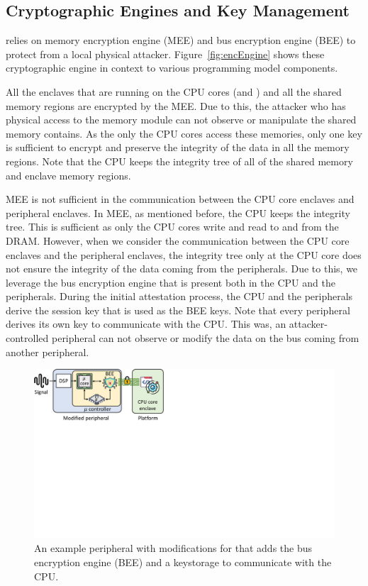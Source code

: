 \subsection{Cryptographic Engines and Key Management}

  \name relies on memory encryption engine (MEE) and bus encryption engine (BEE) to protect from a local physical attacker. Figure~\ref{fig:encEngine} shows these cryptographic engine in context to various \name programming model components.

  All the enclaves that are running on the CPU cores (\app and \ce) and all the shared memory regions are encrypted by the MEE. Due to this, the attacker who has physical access to the memory module can not observe or manipulate the shared memory contains. As the only the CPU cores access these memories, only one key is sufficient to encrypt and preserve the integrity of the data in all the memory regions. Note that the CPU keeps the integrity tree of all of the shared memory and enclave memory regions.

  MEE is not sufficient in the communication between the CPU core enclaves and peripheral enclaves. In MEE, as mentioned before, the CPU keeps the integrity tree. This is sufficient as only the CPU cores write and read to and from the DRAM. However, when we consider the communication between the CPU core enclaves and the peripheral enclaves, the integrity tree only at the CPU core does not ensure the integrity of the data coming from the peripherals. Due to this, we leverage the bus encryption engine that is present both in the CPU and the peripherals. During the initial attestation process, the CPU and the peripherals derive the session key that is used as the BEE keys. Note that every peripheral derives its own key to communicate with the CPU. This was, an attacker-controlled peripheral can not observe or modify the data on the bus coming from another peripheral. 


 \begin{figure}[t]
   \centering
   \includegraphics[trim={0 13cm 18cm 0}, clip, width=0.7\linewidth]{chapters/PIE/images/peripheral.pdf}
   \caption{An example peripheral with modifications for \name{} that adds the bus encryption engine (BEE) and a keystorage to communicate with the CPU.}
   \label{fig:sensor}
 \end{figure}



